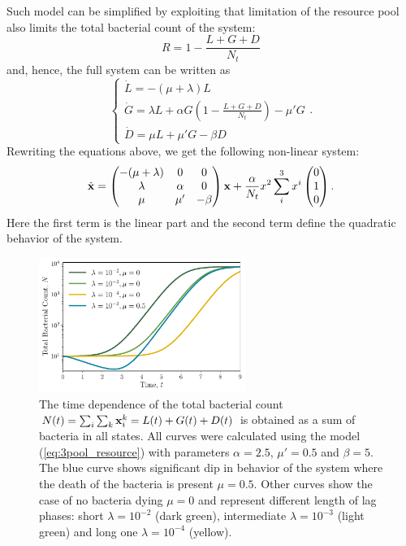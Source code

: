 \documentclass[10pt,A4paper]{article}
\begin{document}
%
Such model can be simplified by exploiting that limitation of the resource pool also limits the total bacterial count of the system:
\begin{equation}
    R = 1 - \frac{L+G+D}{N_t}
\end{equation}
and, hence, the full system can be written as
\begin{equation}
    \begin{cases}
        \dot{L} = -(\mu + \lambda) L\\
        \dot{G} = \lambda L + \alpha G\left(1-\frac{L+G+D}{N_t}\right)-\mu' G\\
        \dot{D} = \mu  L + \mu' G- \beta D 
        \label{eq:3pool_resource} 
    \end{cases}.
\end{equation}
Rewriting the equations above, we get the following non-linear system:
\begin{equation}
    \dot {\mathbf{x}} = \begin{pmatrix}
        -(\mu + \lambda) & 0       & 0 \\
         \lambda         & \alpha  & 0 \\
         \mu &  \mu'& - \beta 
    \end{pmatrix} 
    \mathbf{x} + \frac{\alpha}{N_t} x^2 \sum_i^3 x^i \begin{pmatrix} 0 \\ 1 \\ 0  \end{pmatrix}.
\end{equation}
Here the first term is the linear part and the second term define the quadratic behavior of the system.
\begin{figure}[t]
    \begin{center}
    \includegraphics[width=0.6\textwidth]{Figures/pool_model_3pools_resource.pdf}
    \caption{
        The time dependence of the total bacterial count $N(t) = \sum_i \sum_k \mathbf{x}_i^k = L(t) + G(t) + D(t)$ is obtained as a sum of bacteria in all states.
        All curves were calculated using the model (\ref{eq:3pool_resource}) with parameters $\alpha=2.5$, $\mu'=0.5$ and $\beta=5$.
        The blue curve shows significant dip in behavior of the system where the death of the bacteria is present $\mu = 0.5$.
        Other curves show the case of no bacteria dying $\mu=0$ and represent different length of lag phases:
        short $\lambda=10^{-2}$ (dark green), intermediate $\lambda=10^{-3}$ (light green) and long one $\lambda=10^{-4}$ (yellow).
    }
    \label{fig:3pool_resource_plots}
    \end{center}
\end{figure}
\end{document}
